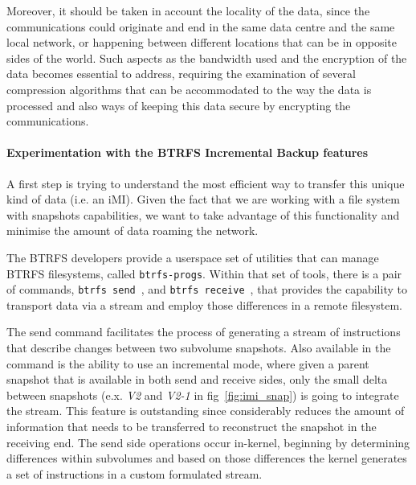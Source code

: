 Moreover, it should be taken in account the locality of the data, since the communications could originate and end in the same data centre and the same local network, or happening between different locations that can be in opposite sides of the world. Such aspects as the bandwidth used and the encryption of the data becomes essential to address, requiring the examination of several compression algorithms that can be accommodated to the way the data is processed and also ways of keeping this data secure by encrypting the communications.
\newpage



\paragraph{Experimentation with the BTRFS Incremental Backup features}
\label{par:incremental_btrfs}

A first step is trying to understand the most efficient way to transfer this unique kind of data (i.e. an iMI). Given the fact that we are working with a file system with snapshots capabilities, we want to take advantage of this functionality and minimise the amount of data roaming the network.

The BTRFS developers provide a userspace set of utilities that can manage BTRFS filesystems, called \texttt{btrfs-progs}. Within that set of tools, there is a pair of commands, \texttt{btrfs send}~\cite{btrfs_send}, and \texttt{btrfs receive}~\cite{btrfs_receive}, that provides the capability to transport data via a stream and employ those differences in a remote filesystem. 

The send command facilitates the process of generating a stream of instructions that describe changes between two subvolume snapshots. Also available in the command is the ability to use an incremental mode, where given a parent snapshot that is available in both send and receive sides, only the small delta between snapshots (e.x. \textit{V2} and \textit{V2-1} in fig~\ref{fig:imi_snap}) is going to integrate the stream. This feature is outstanding since considerably reduces the amount of information that needs to be transferred to reconstruct the snapshot in the receiving end. The send side operations occur in-kernel, beginning by determining differences within subvolumes and based on those differences the kernel generates a set of instructions in a custom formulated stream.

